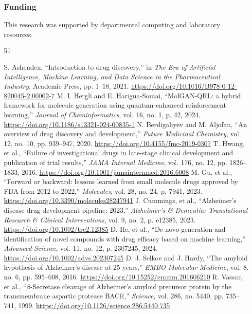 \documentclass[10pt,a4paper]{article}
\begin{document}
\subsubsection*{Funding}
This research was supported by departmental computing and laboratory resources.

\begin{thebibliography}{51}
\small
\setlength{\itemsep}{0.4pt}
\setlength{\parskip}{0pt}

 S. Ashenden, ``Introduction to drug discovery,'' in \textit{The Era of Artificial Intelligence, Machine Learning, and Data Science in the Pharmaceutical Industry}, Academic Press, pp. 1--18, 2021. \url{https://doi.org/10.1016/B978-0-12-820045-2.00002-7}
 M. I. Hergli and E. Harigua-Souiai, ``MolGAN-QRL: a hybrid framework for molecule generation using quantum-enhanced reinforcement learning,'' \textit{Journal of Cheminformatics}, vol. 16, no. 1, p. 42, 2024. \url{https://doi.org/10.1186/s13321-024-00835-1}
 N. Berdigaliyev and M. Aljofan, ``An overview of drug discovery and development,'' \textit{Future Medicinal Chemistry}, vol. 12, no. 10, pp. 939--947, 2020. \url{https://doi.org/10.4155/fmc-2019-0307}
 T. Hwang, et al., ``Failure of investigational drugs in late-stage clinical development and publication of trial results,'' \textit{JAMA Internal Medicine}, vol. 176, no. 12, pp. 1826--1833, 2016. \url{https://doi.org/10.1001/jamainternmed.2016.6008}
 M. Gu, et al., ``Forward or backward: lessons learned from small molecule drugs approved by FDA from 2012 to 2022,'' \textit{Molecules}, vol. 28, no. 24, p. 7941, 2023. \url{https://doi.org/10.3390/molecules28247941}
 J. Cummings, et al., ``Alzheimer's disease drug development pipeline: 2023,'' \textit{Alzheimer's \& Dementia: Translational Research \& Clinical Interventions}, vol. 9, no. 2, p. e12385, 2023. \url{https://doi.org/10.1002/trc2.12385}
 D. He, et al., ``De novo generation and identification of novel compounds with drug efficacy based on machine learning,'' \textit{Advanced Science}, vol. 11, no. 12, p. 2307245, 2024. \url{https://doi.org/10.1002/advs.202307245}
 D. J. Selkoe and J. Hardy, ``The amyloid hypothesis of Alzheimer's disease at 25 years,'' \textit{EMBO Molecular Medicine}, vol. 8, no. 6, pp. 595--608, 2016. \url{https://doi.org/10.15252/emmm.201606210}
 R. Vassar, et al., ``$\beta$-Secretase cleavage of Alzheimer's amyloid precursor protein by the transmembrane aspartic protease BACE,'' \textit{Science}, vol. 286, no. 5440, pp. 735--741, 1999. \url{https://doi.org/10.1126/science.286.5440.735}

\end{thebibliography}
\end{document}
